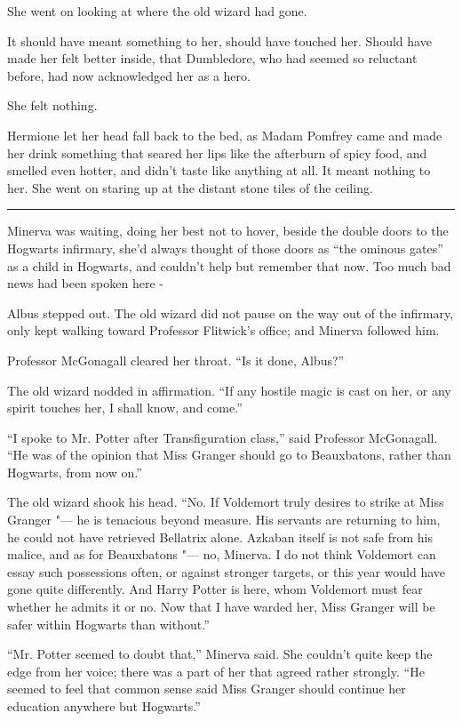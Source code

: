 She went on looking at where the old wizard had gone.

It should have meant something to her, should have touched her. Should
have made her felt better inside, that Dumbledore, who had seemed so
reluctant before, had now acknowledged her as a hero.

She felt nothing.

Hermione let her head fall back to the bed, as Madam Pomfrey came and
made her drink something that seared her lips like the afterburn of
spicy food, and smelled even hotter, and didn't taste like anything at
all. It meant nothing to her. She went on staring up at the distant
stone tiles of the ceiling.

\begin{center}\rule{3in}{0.4pt}\end{center}

Minerva was waiting, doing her best not to hover, beside the double
doors to the Hogwarts infirmary, she'd always thought of those doors as
``the ominous gates'' as a child in Hogwarts, and couldn't help but
remember that now. Too much bad news had been spoken here -

Albus stepped out. The old wizard did not pause on the way out of the
infirmary, only kept walking toward Professor Flitwick's office; and
Minerva followed him.

Professor McGonagall cleared her throat. ``Is it done, Albus?''

The old wizard nodded in affirmation. ``If any hostile magic is cast on
her, or any spirit touches her, I shall know, and come.''

``I spoke to Mr. Potter after Transfiguration class,'' said Professor
McGonagall. ``He was of the opinion that Miss Granger should go to
Beauxbatons, rather than Hogwarts, from now on.''

The old wizard shook his head. ``No. If Voldemort truly desires to
strike at Miss Granger "--- he is tenacious beyond measure. His servants
are returning to him, he could not have retrieved Bellatrix alone.
Azkaban itself is not safe from his malice, and as for Beauxbatons "--- no,
Minerva. I do not think Voldemort can essay such possessions often, or
against stronger targets, or this year would have gone quite
differently. And Harry Potter is here, whom Voldemort must fear whether
he admits it or no. Now that I have warded her, Miss Granger will be
safer within Hogwarts than without.''

``Mr. Potter seemed to doubt that,'' Minerva said. She couldn't quite
keep the edge from her voice; there was a part of her that agreed rather
strongly. ``He seemed to feel that common sense said Miss Granger should
continue her education anywhere but Hogwarts.''

